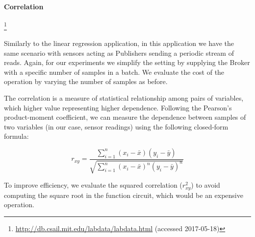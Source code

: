 
\paragraph{Correlation}


\footnote{\url{http://db.csail.mit.edu/labdata/labdata.html} (accessed 2017-05-18)}


Similarly to the linear regression application, in this application we have the
same scenario with sensors acting as Publishers sending a periodic stream of
reads.  Again, for our experiments we simplify the setting by supplying the
Broker with a specific number of samples in a batch.  We evaluate the cost of
the operation by varying the number of samples as before.

The correlation is a measure of statistical relationship among pairs of
variables, which higher value representing higher dependence.  Following the
Pearson's product-moment coefficient, we can measure the dependence between
samples of two variables (in our case, sensor readings) using the following
closed-form formula:

\[
r_{xy} = \frac{\displaystyle\sum_{i=1}^n (x_i - \bar{x}) (y_i - \bar{y})}
{\sqrt{\displaystyle\sum_{i=1}^n (x_i - \bar{x})^n (y_i - \bar{y})^n}}
\]
\bigskip

To improve efficiency, we evaluate the squared correlation ($r_{xy}^2$) to avoid
computing the square root in the function circuit, which would be an expensive
operation.

